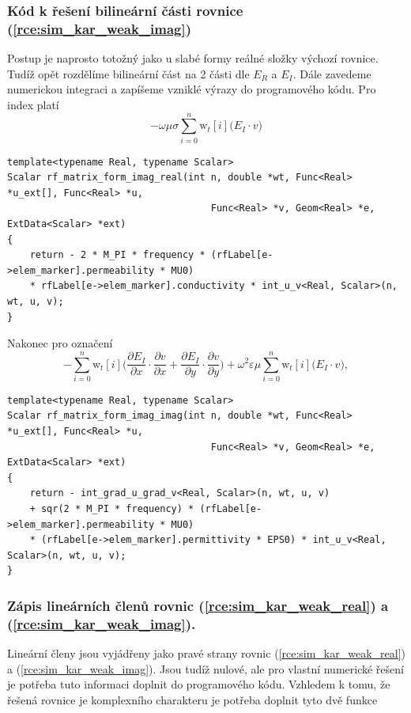 \subsubsection*{Kód k řešení bilineární části rovnice (\ref{rce:sim_kar_weak_imag})}
Postup je naprosto totožný jako u slabé formy reálné složky výchozí rovnice. Tudíž opět rozdělíme bilineární část na 2 části dle $E_R$ a $E_I$. Dále zavedeme numerickou integraci a zapíšeme vzniklé výrazy do programového kódu. Pro index  platí
\begin{equation}
 -\omega\mu\sigma\sum_{i=0}^{n}\mathrm{w}_{t}[i]\bigg(E_I\cdot v\bigg)
	\label{rce:sim_kar_weak_imag_real_num} 
\end{equation}
\begin{verbatim}
template<typename Real, typename Scalar>
Scalar rf_matrix_form_imag_real(int n, double *wt, Func<Real> *u_ext[], Func<Real> *u,
									Func<Real> *v, Geom<Real> *e, ExtData<Scalar> *ext)
{
    return - 2 * M_PI * frequency * (rfLabel[e->elem_marker].permeability * MU0) 
    * rfLabel[e->elem_marker].conductivity * int_u_v<Real, Scalar>(n, wt, u, v);
}
\end{verbatim}
Nakonec pro označení 
\begin{equation}
	-\sum_{i=0}^{n}\mathrm{w}_{t}[i]\bigg(\frac{\partial E_I}{\partial x}\cdot \frac{\partial v}{\partial x} + \frac{\partial E_I}{\partial y}\cdot \frac{\partial v}{\partial y} \bigg) + \omega^{2}\varepsilon\mu\sum_{i=0}^{n}\mathrm{w}_{t}[i]\bigg(E_I\cdot v\bigg),
	\label{rce:sim_kar_weak_imag_imag_num} 
\end{equation}
\begin{verbatim}
template<typename Real, typename Scalar>
Scalar rf_matrix_form_imag_imag(int n, double *wt, Func<Real> *u_ext[], Func<Real> *u,
                                    Func<Real> *v, Geom<Real> *e, ExtData<Scalar> *ext)
{
    return - int_grad_u_grad_v<Real, Scalar>(n, wt, u, v) 
    + sqr(2 * M_PI * frequency) * (rfLabel[e->elem_marker].permeability * MU0) 
    * (rfLabel[e->elem_marker].permittivity * EPS0) * int_u_v<Real, Scalar>(n, wt, u, v);
}
\end{verbatim}

\subsubsection*{Zápis lineárních členů rovnic (\ref{rce:sim_kar_weak_real}) a (\ref{rce:sim_kar_weak_imag}).}
Lineární členy jsou vyjádřeny jako pravé strany rovnic (\ref{rce:sim_kar_weak_real}) a (\ref{rce:sim_kar_weak_imag}). Jsou tudíž nulové, ale pro vlastní numerické řešení je potřeba tuto informaci doplnit do programového kódu. Vzhledem k tomu, že řešená rovnice je komplexního charakteru je potřeba doplnit tyto dvě funkce 

